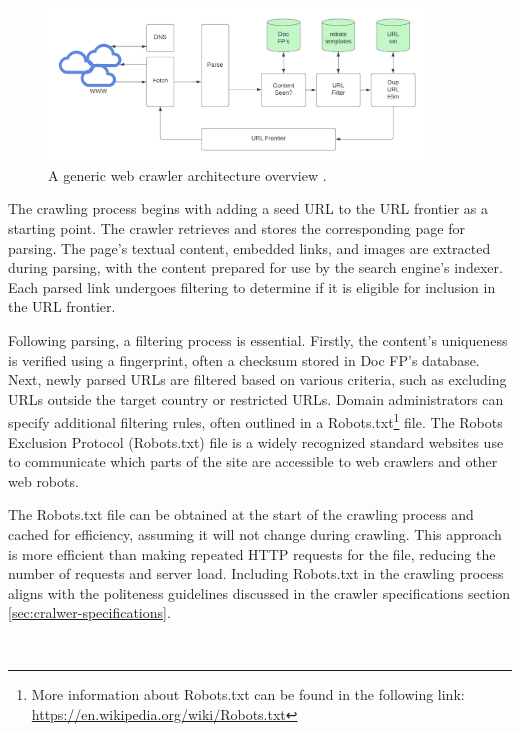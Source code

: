 \begin{figure}[h]	
     \centering
     \includegraphics[width=10cm]{images/crawler_architecture.png}
     \caption{A generic web crawler architecture overview \cite{introduction-ir}.}
     \label{fig:web-crawler-arch}
\end{figure}

The crawling process begins with adding a seed URL to the URL frontier as a starting point. The crawler retrieves and stores the corresponding page for parsing. The page's textual content, embedded links, and images are extracted during parsing, with the content prepared for use by the search engine's indexer. Each parsed link undergoes filtering to determine if it is eligible for inclusion in the URL frontier.

Following parsing, a filtering process is essential. Firstly, the content's uniqueness is verified using a fingerprint, often a checksum stored in Doc FP's database. Next, newly parsed URLs are filtered based on various criteria, such as excluding URLs outside the target country or restricted URLs. Domain administrators can specify additional filtering rules, often outlined in a Robots.txt\footnote{More information about Robots.txt can be found in the following link:  \url{https://en.wikipedia.org/wiki/Robots.txt}} file. The Robots Exclusion Protocol (Robots.txt) file is a widely recognized standard websites use to communicate which parts of the site are accessible to web crawlers and other web robots.

The Robots.txt file can be obtained at the start of the crawling process and cached for efficiency, assuming it will not change during crawling. This approach is more efficient than making repeated HTTP requests for the file, reducing the number of requests and server load. Including Robots.txt in the crawling process aligns with the politeness guidelines discussed in the crawler specifications section \ref{sec:cralwer-specifications}.


\\


